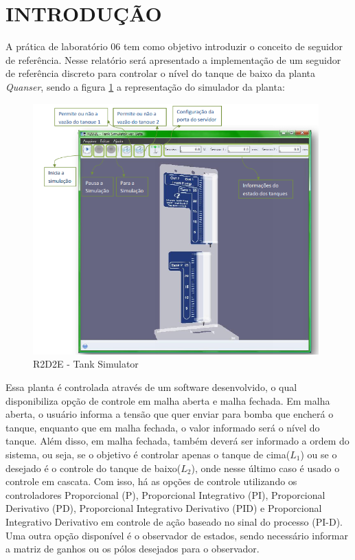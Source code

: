 \documentclass[a4paper,12pt]{article}
\begin{document}
\newpage


\thispagestyle{main}

\section{INTRODUÇÃO}

\hspace{4ex}A prática de laboratório 06 tem como objetivo introduzir o conceito de seguidor de referência. Nesse relatório será apresentado a implementação de um seguidor de referência discreto para controlar o nível do tanque de baixo da planta \textit{Quanser}, sendo a figura \ref{r2d2e} a representação do simulador da planta:

\begin{figure}[H]
\centering
\includegraphics[width=11cm]{ImagensLab4/simulator.png}
\caption{R2D2E - Tank Simulator}
\label{r2d2e}
\end{figure}

\hspace{4ex}Essa planta é controlada através de um software desenvolvido, o qual disponibiliza opção de controle em malha aberta e malha fechada. Em malha aberta, o usuário informa a tensão que quer enviar para bomba que encherá o tanque, enquanto que em malha fechada, o valor informado será o nível do tanque. Além disso, em malha fechada, também deverá ser informado a ordem do sistema, ou seja, se o objetivo é controlar apenas o tanque de cima($L_1$) ou se o desejado é o controle do tanque de baixo($L_2$), onde nesse último caso é usado o controle em cascata. Com isso, há as opções de controle utilizando os controladores Proporcional (P), Proporcional Integrativo (PI), Proporcional Derivativo (PD), Proporcional Integrativo Derivativo (PID) e Proporcional Integrativo Derivativo em controle de ação baseado no sinal do processo (PI-D). Uma outra opção disponível é o observador de estados, sendo necessário informar a matriz de ganhos ou os pólos desejados para o observador.
\end{document}
